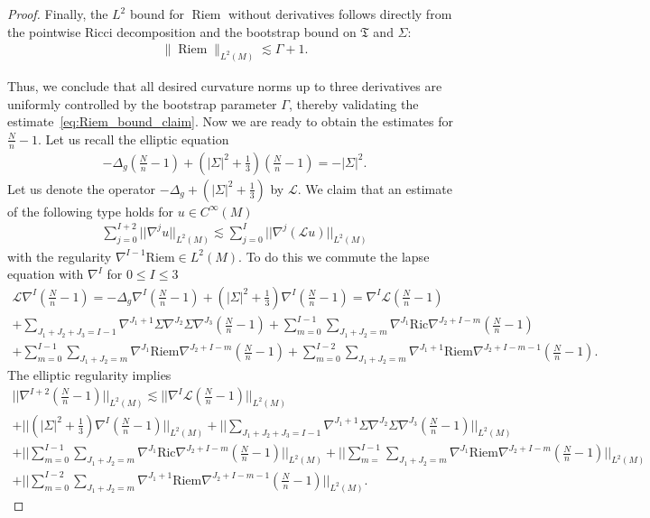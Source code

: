 \documentclass{amsart}
\begin{document}
\begin{proof}
\noindent
Finally, the $L^2$ bound for $\operatorname{Riem}$ without derivatives follows directly from the pointwise Ricci decomposition and the bootstrap bound on $\mathfrak{T}$ and $\Sigma$:
\begin{align}
    \| \operatorname{Riem} \|_{L^2(M)} \lesssim \Gamma + 1.
\end{align}

\noindent
Thus, we conclude that all desired curvature norms up to three derivatives are uniformly controlled by the bootstrap parameter $\Gamma$, thereby validating the estimate~\eqref{eq:Riem_bound_claim}. Now we are ready to obtain the estimates for $\frac{N}{n}-1$. Let us recall the elliptic equation 
\begin{align}
-\Delta_{g}(\frac{N}{n}-1)+(|\Sigma|^{2}+\frac{1}{3})(\frac{N}{n}-1)=-|\Sigma|^{2}.    
\end{align}
Let us denote the operator $-\Delta_{g}+(|\Sigma|^{2}+\frac{1}{3})$ by $\mathscr{L}$. We claim that an estimate of the following type holds for $u\in C^{\infty}(M)$
\begin{align}
\sum_{j=0}^{I+2}||\nabla^{j}u||_{L^{2}(M)}\lesssim \sum_{j=0}^{I}||\nabla^{j}(\mathscr{L}u)||_{L^{2}(M)}
\end{align}
with the regularity $\nabla^{I-1}\text{Riem}\in L^{2}(M)$. To do this we commute the lapse equation with $\nabla^{I}$ for $0\leq I\leq 3$
\begin{align}
\mathscr{L}\nabla^{I}(\frac{N}{n}-1)=-\Delta_{g}\nabla^{I}(\frac{N}{n}-1)+(|\Sigma|^{2}+\frac{1}{3})\nabla^{I}(\frac{N}{n}-1)\nonumber=\nabla^{I}\mathscr{L}(\frac{N}{n}-1)\\\nonumber+\sum_{J_{1}+J_{2}+J_{3}=I-1}\nabla^{J_{1}+1}\Sigma\nabla^{J_{2}}\Sigma\nabla^{J_{3}}(\frac{N}{n}-1)+\sum_{m=0}^{I-1}\sum_{J_{1}+J_{2}=m}\nabla^{J_{1}}\text{Ric}\nabla^{J_{2}+I-m}(\frac{N}{n}-1)\\\nonumber+\sum_{m=0}^{I-1}\sum_{J_{1}+J_{2}=m}\nabla^{J_{1}}\text{Riem}\nabla^{J_{2}+I-m}(\frac{N}{n}-1)+\sum_{m=0}^{I-2}\sum_{J_{1}+J_{2}=m}\nabla^{J_{1}+1}\text{Riem}\nabla^{J_{2}+I-m-1}(\frac{N}{n}-1).
\end{align}
The elliptic regularity implies 
\begin{align}
\nonumber||\nabla^{I+2}(\frac{N}{n}-1)||_{L^{2}(M)}\lesssim ||\nabla^{I}\mathscr{L}(\frac{N}{n}-1)||_{L^{2}(M)}\\\nonumber+||(|\Sigma|^{2}+\frac{1}{3})\nabla^{I}(\frac{N}{n}-1)||_{L^{2}(M)}+||\sum_{J_{1}+J_{2}+J_{3}=I-1}\nabla^{J_{1}+1}\Sigma\nabla^{J_{2}}\Sigma\nabla^{J_{3}}(\frac{N}{n}-1)||_{L^{2}(M)}\\\nonumber+||\sum_{m=0}^{I-1}\sum_{J_{1}+J_{2}=m}\nabla^{J_{1}}\text{Ric}\nabla^{J_{2}+I-m}(\frac{N}{n}-1)||_{L^{2}(M)}+||\sum_{m=}^{I-1}\sum_{J_{1}+J_{2}=m}\nabla^{J_{1}}\text{Riem}\nabla^{J_{2}+I-m}(\frac{N}{n}-1)||_{L^{2}(M)}\\\nonumber+||\sum_{m=0}^{I-2}\sum_{J_{1}+J_{2}=m}\nabla^{J_{1}+1}\text{Riem}\nabla^{J_{2}+I-m-1}(\frac{N}{n}-1)||_{L^{2}(M)}.    

\end{align}
\end{proof}
\end{document}
